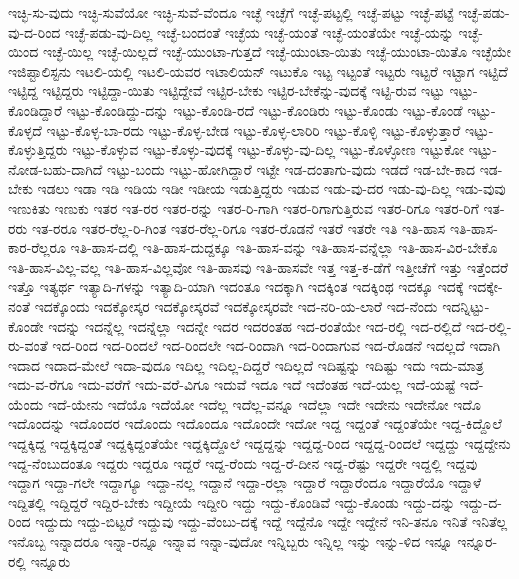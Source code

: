 {ಇಚ್ಛಿ-ಸು-ವುದು
ಇಚ್ಛಿ-ಸುವೆಯೋ
ಇಚ್ಛಿ-ಸುವೆ-ವೆಂದೂ
ಇಚ್ಛೆ
ಇಚ್ಛೆಗೆ
ಇಚ್ಛೆ-ಪಟ್ಟಲ್ಲಿ
ಇಚ್ಛೆ-ಪಟ್ಟು
ಇಚ್ಛೆ-ಪಟ್ಟೆ
ಇಚ್ಛೆ-ಪಡು-ವು-ದ-ರಿಂದ
ಇಚ್ಛೆ-ಪಡು-ವು-ದಿಲ್ಲ
ಇಚ್ಛೆ-ಬಂದಂತೆ
ಇಚ್ಛೆಯ
ಇಚ್ಛೆ-ಯಂತೆ
ಇಚ್ಛೆ-ಯಂತೆಯೇ
ಇಚ್ಛೆ-ಯನ್ನು
ಇಚ್ಛೆ-ಯಿಂದ
ಇಚ್ಛೆ-ಯಿಲ್ಲ
ಇಚ್ಛೆ-ಯಿಲ್ಲದೆ
ಇಚ್ಛೆ-ಯುಂಟಾ-ಗುತ್ತದೆ
ಇಚ್ಛೆ-ಯುಂಟಾ-ಯಿತು
ಇಚ್ಛೆ-ಯುಂಟಾ-ಯಿತೊ
ಇಚ್ಛೆಯೇ
ಇಜಿಪ್ಟಾಲಿಸ್ಟನು
ಇಟಲಿ-ಯಲ್ಲಿ
ಇಟಲಿ-ಯವರ
ಇಟಾಲಿಯನ್
ಇಟುಕೊ
ಇಟ್ಟ
ಇಟ್ಟಂತೆ
ಇಟ್ಟರು
ಇಟ್ಟರೆ
ಇಟ್ಟಾಗ
ಇಟ್ಟಿದೆ
ಇಟ್ಟಿದ್ದ
ಇಟ್ಟಿದ್ದರು
ಇಟ್ಟಿದ್ದಾ-ಯಿತು
ಇಟ್ಟಿದ್ದೇವೆ
ಇಟ್ಟಿರ-ಬೇಕು
ಇಟ್ಟಿರ-ಬೇಕೆನ್ನು-ವುದಕ್ಕೆ
ಇಟ್ಟಿ-ರುವ
ಇಟ್ಟು
ಇಟ್ಟು-ಕೊಂಡಿದ್ದಾರೆ
ಇಟ್ಟು-ಕೊಂಡಿದ್ದು-ದನ್ನು
ಇಟ್ಟು-ಕೊಂಡಿ-ರದೆ
ಇಟ್ಟು-ಕೊಂಡಿರು
ಇಟ್ಟು-ಕೊಂಡು
ಇಟ್ಟು-ಕೊಂಡೆ
ಇಟ್ಟು-ಕೊಳ್ಳದೆ
ಇಟ್ಟು-ಕೊಳ್ಳ-ಬಾ-ರದು
ಇಟ್ಟು-ಕೊಳ್ಳ-ಬೇಡ
ಇಟ್ಟು-ಕೊಳ್ಳ-ಲಾರಿರಿ
ಇಟ್ಟು-ಕೊಳ್ಳಿ
ಇಟ್ಟು-ಕೊಳ್ಳುತ್ತಾರೆ
ಇಟ್ಟು-ಕೊಳ್ಳುತ್ತಿದ್ದರು
ಇಟ್ಟು-ಕೊಳ್ಳುವ
ಇಟ್ಟು-ಕೊಳ್ಳು-ವುದಕ್ಕೆ
ಇಟ್ಟು-ಕೊಳ್ಳು-ವು-ದಿಲ್ಲ
ಇಟ್ಟು-ಕೊಳ್ಳೋಣ
ಇಟ್ಟುಕೋ
ಇಟ್ಟು-ನೋಡ-ಬಹು-ದಾಗಿದೆ
ಇಟ್ಟು-ಬಂದು
ಇಟ್ಟು-ಹೋಗಿದ್ದಾರೆ
ಇಟ್ಟೇ
ಇಡ-ದಂತಾಗು-ವುದು
ಇಡದೆ
ಇಡ-ಬೇ-ಕಾದ
ಇಡ-ಬೇಕು
ಇಡಲು
ಇಡಾ
ಇಡಿ
ಇಡಿಯ
ಇಡೀ
ಇಡೀಯ
ಇಡುತ್ತಿದ್ದರು
ಇಡುವ
ಇಡು-ವು-ದರ
ಇಡು-ವು-ದಿಲ್ಲ
ಇಡು-ವುವು
ಇಣುಕಿತು
ಇಣುಕು
ಇತರ
ಇತ-ರರ
ಇತರ-ರನ್ನು
ಇತರ-ರಿ-ಗಾಗಿ
ಇತರ-ರಿಗಾಗುತ್ತಿರುವ
ಇತರ-ರಿಗೂ
ಇತರ-ರಿಗೆ
ಇತ-ರರು
ಇತ-ರರೂ
ಇತರ-ರೆಲ್ಲ-ರಿ-ಗಿಂತ
ಇತರ-ರೆಲ್ಲ-ರಿಗೂ
ಇತರ-ರೊಡನೆ
ಇತರೆ
ಇತರೇ
ಇತಿ
ಇತಿ-ಹಾಸ
ಇತಿ-ಹಾಸ-ಕಾರ-ರೆಲ್ಲರೂ
ಇತಿ-ಹಾಸ-ದಲ್ಲಿ
ಇತಿ-ಹಾಸ-ದುದ್ದಕ್ಕೂ
ಇತಿ-ಹಾಸ-ವನ್ನು
ಇತಿ-ಹಾಸ-ವನ್ನೆಲ್ಲಾ
ಇತಿ-ಹಾಸ-ವಿರ-ಬೇಕೊ
ಇತಿ-ಹಾಸ-ವಿಲ್ಲ-ವಲ್ಲ
ಇತಿ-ಹಾಸ-ವಿಲ್ಲವೋ
ಇತಿ-ಹಾಸವು
ಇತಿ-ಹಾಸವೇ
ಇತ್ತ
ಇತ್ತ-ಕ-ಡೆಗೆ
ಇತ್ತೀಚೆಗೆ
ಇತ್ತು
ಇತ್ತೆಂದರೆ
ಇತ್ತೊ
ಇತ್ಯರ್ಥ
ಇತ್ಯಾದಿ-ಗಳನ್ನು
ಇತ್ಯಾದಿ-ಯಾಗಿ
ಇದಂತೂ
ಇದಕ್ಕಾಗಿ
ಇದಕ್ಕಿಂತ
ಇದಕ್ಕಿಂಥ
ಇದಕ್ಕೂ
ಇದಕ್ಕೆ
ಇದಕ್ಕೇ-ನಂತೆ
ಇದಕ್ಕೊಂದು
ಇದಕ್ಕೋಸ್ಕರ
ಇದಕ್ಕೋಸ್ಕರವೆ
ಇದಕ್ಕೋಸ್ಕರವೇ
ಇದ-ನರಿ-ಯ-ಲಾರೆ
ಇದ-ನೆಂದು
ಇದನ್ನಿಟ್ಟು-ಕೊಂಡೇ
ಇದನ್ನು
ಇದನ್ನೆಲ್ಲ
ಇದನ್ನೆಲ್ಲಾ
ಇದನ್ನೇ
ಇದರ
ಇದರಂತಹ
ಇದ-ರಂತೆಯೇ
ಇದ-ರಲ್ಲಿ
ಇದ-ರಲ್ಲಿದೆ
ಇದ-ರಲ್ಲಿ-ರು-ವಂತೆ
ಇದ-ರಿಂದ
ಇದ-ರಿಂದಲೆ
ಇದ-ರಿಂದಲೇ
ಇದ-ರಿಂದಾಗಿ
ಇದ-ರಿಂದಾಗುವ
ಇದ-ರೊಡನೆ
ಇದಲ್ಲದೆ
ಇದಾಗಿ
ಇದಾದ
ಇದಾದ-ಮೇಲೆ
ಇದಾ-ವುದೂ
ಇದಿಲ್ಲ
ಇದಿಲ್ಲ-ದಿದ್ದರೆ
ಇದಿಲ್ಲದೆ
ಇದಿಷ್ಟನ್ನು
ಇದಿಷ್ಟು
ಇದು
ಇದು-ಮಾತ್ರ
ಇದು-ವ-ರೆಗೂ
ಇದು-ವರೆಗೆ
ಇದು-ವರೆ-ವಿಗೂ
ಇದುವೆ
ಇದೂ
ಇದೆ
ಇದೆಂತಹ
ಇದೆ-ಯಲ್ಲ
ಇದೆ-ಯಷ್ಟೆ
ಇದೆ-ಯೆಂದು
ಇದೆ-ಯೇನು
ಇದೆಯೊ
ಇದೆಯೋ
ಇದೆಲ್ಲ
ಇದೆಲ್ಲ-ವನ್ನೂ
ಇದೆಲ್ಲಾ
ಇದೇ
ಇದೇನು
ಇದೇನೋ
ಇದೊ
ಇದೊಂದನ್ನು
ಇದೊಂದರ
ಇದೊಂದು
ಇದೊಂದೂ
ಇದೊಂದೇ
ಇದೋ
ಇದ್ದ
ಇದ್ದಂತೆ
ಇದ್ದಂತೆಯೇ
ಇದ್ದ-ಕಿದ್ದೊಲೆ
ಇದ್ದಕ್ಕಿದ್ದ
ಇದ್ದಕ್ಕಿದ್ದಂತೆ
ಇದ್ದಕ್ಕಿದ್ದಂತೆಯೇ
ಇದ್ದಕ್ಕಿದ್ದೊಲೆ
ಇದ್ದದ್ದನ್ನು
ಇದ್ದದ್ದ-ರಿಂದ
ಇದ್ದದ್ದ-ರಿಂದಲೆ
ಇದ್ದದ್ದು
ಇದ್ದದ್ದೇನು
ಇದ್ದ-ನೆಂಬುದಂತೂ
ಇದ್ದರು
ಇದ್ದರೂ
ಇದ್ದರೆ
ಇದ್ದ-ರೆಂದು
ಇದ್ದ-ರೆ-ದೀನ
ಇದ್ದ-ರೆಷ್ಟು
ಇದ್ದರೇ
ಇದ್ದಲ್ಲಿ
ಇದ್ದವು
ಇದ್ದಾಗ
ಇದ್ದಾ-ಗಲೇ
ಇದ್ದಾಗ್ಯೂ
ಇದ್ದಾ-ನಲ್ಲ
ಇದ್ದಾನೆ
ಇದ್ದಾ-ರಲ್ಲಾ
ಇದ್ದಾರೆ
ಇದ್ದಾರೆಂದೂ
ಇದ್ದಾರೆಯೊ
ಇದ್ದಾಳೆ
ಇದ್ದಿತಲ್ಲಿ
ಇದ್ದಿದ್ದರೆ
ಇದ್ದಿರ-ಬೇಕು
ಇದ್ದೀಯೆ
ಇದ್ದೀರಿ
ಇದ್ದು
ಇದ್ದು-ಕೊಂಡಿವೆ
ಇದ್ದು-ಕೊಂಡು
ಇದ್ದು-ದನ್ನು
ಇದ್ದು-ದ-ರಿಂದ
ಇದ್ದುದು
ಇದ್ದು-ಬಿಟ್ಟರೆ
ಇದ್ದುವು
ಇದ್ದು-ವೆಂಬು-ದಕ್ಕೆ
ಇದ್ದೆ
ಇದ್ದೆನೊ
ಇದ್ದೇ
ಇದ್ದೇನೆ
ಇನಿ-ತನೂ
ಇನಿತೆ
ಇನಿತೆಲ್ಲ
ಇನೊಬ್ಬ
ಇನ್ನಾದರೂ
ಇನ್ನಾ-ರನ್ನೂ
ಇನ್ನಾವ
ಇನ್ನಾ-ವುದೋ
ಇನ್ನಿಬ್ಬರು
ಇನ್ನಿಲ್ಲ
ಇನ್ನು
ಇನ್ನು-ಳಿದ
ಇನ್ನೂ
ಇನ್ನೂರ-ರಲ್ಲಿ
ಇನ್ನೂರು
}
